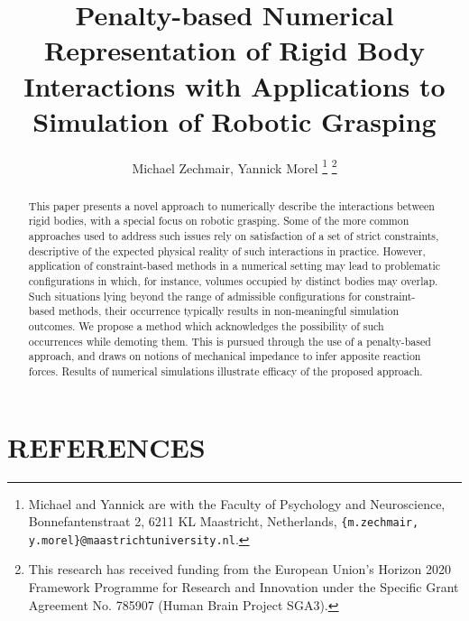 \documentclass[letterpaper, 10pt, conference]{ieeeconf}
\title{\LARGE \bf Penalty-based Numerical Representation of Rigid Body Interactions with Applications to Simulation of Robotic Grasping}
\author{Michael Zechmair, Yannick Morel%
	\thanks{Michael and Yannick are with the Faculty of Psychology and Neuroscience,
		Bonnefantenstraat 2, 6211 KL Maastricht, Netherlands,
		{\tt\scriptsize \{m.zechmair, y.morel\}@maastrichtuniversity.nl}.}%
	\thanks{This research has received funding from the European Union's Horizon 2020 Framework Programme for Research and Innovation under the Specific Grant Agreement No. 785907 (Human Brain Project SGA3).}%
}
\begin{document}
	\maketitle
	\thispagestyle{empty}
	\pagestyle{empty}
	
	\noindent\begin{abstract}
		This paper presents a novel approach to numerically describe the interactions between rigid bodies, with a special focus on robotic grasping. Some of the more common approaches used to address such issues rely on satisfaction of a set of strict constraints, descriptive of the expected physical reality of such interactions in practice. However, application of constraint-based methods in a numerical setting may lead to problematic configurations in which, for instance, volumes occupied by distinct bodies may overlap. Such situations lying beyond the range of admissible configurations for constraint-based methods, their occurrence typically results in non-meaningful simulation outcomes. We propose a method which acknowledges the possibility of such occurrences while demoting them. This is pursued through the use of a penalty-based approach, and draws on notions of mechanical impedance to infer apposite reaction forces. Results of numerical simulations illustrate efficacy of the proposed approach.
	\end{abstract}
	
	
	
	
	
	
	
	
	\section{REFERENCES}
	
	\begingroup
	\renewcommand{\section}[2]{}%
	
	\endgroup
	
\end{document}
